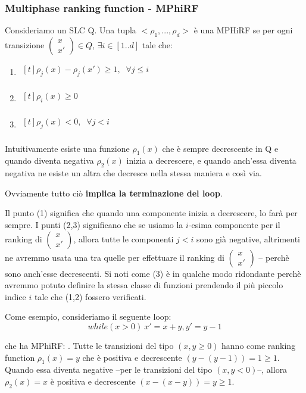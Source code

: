 \documentclass[a4paper]{article}
\begin{document}
\subsubsection{Multiphase ranking function - MPhiRF}

Consideriamo un SLC Q. Una tupla \(<\rho_1,...,\rho_d>\) è una MPHiRF
se per ogni transizione \(\begin{pmatrix}x\\x'\end{pmatrix} \in Q\), \(\exists i \in [1..d]\) tale che:
\begin{enumerate}
\item $\begin{aligned}[t]
    \rho_j(x)-\rho_j(x') \geq 1, \;\;\forall j \leq i\\
\end{aligned}$
\item $\begin{aligned}[t]
    \rho_i(x) \geq 0\\
\end{aligned}$
\item $\begin{aligned}[t]
    \rho_j(x)< 0,  \;\;\forall j<i\\
\end{aligned}$
\end{enumerate}

Intuitivamente esiste una funzione $\rho_1(x)$ che è sempre
decrescente in  Q e quando diventa negativa $\rho_2(x)$ inizia a decrescere,
e quando anch'essa diventa negativa ne esiste un altra che decresce nella stessa
maniera e così via.

Ovviamente tutto ciò \textbf{implica la terminazione del loop}.

Il punto (1) significa che quando una componente inizia a decrescere, lo farà
per sempre.
I punti (2,3) significano che se usiamo la $i$-esima componente per il ranking
di $\begin{pmatrix}x\\x'\end{pmatrix}$, allora tutte le componenti $j<i$ sono
già negative, altrimenti ne avremmo usata una tra quelle per effettuare il ranking di $\begin{pmatrix}x\\x'\end{pmatrix}$
-- perchè sono anch'esse decrescenti.
Si noti come (3) è in qualche modo ridondante perchè avremmo potuto definire la
stessa classe di funzioni prendendo il più piccolo indice $i$ tale che (1,2)
fossero verificati.

Come esempio, consideriamo il seguente loop:
    \[while ( x>0 )\: { x'=x+y, y'=y-1 }\]

che ha MPhiRF: \(<y,x>.\)
Tutte le transizioni del tipo $(x,y\geq 0)$ hanno come ranking function
$\rho_1(x)=y$ che è positiva e decrescente $(y-(y-1)) =1 \geq 1$. Quando essa
diventa negative --per le transizioni del tipo $(x,y<0)$--, allora
$\rho_2(x)=x$ è positiva e decrescente $(x - (x-y)) = y \geq 1$.
\end{document}
